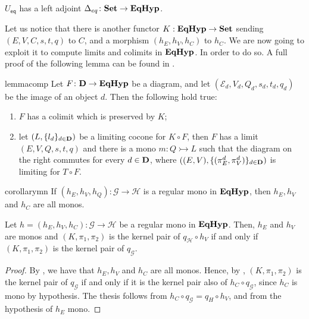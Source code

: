 \documentclass[a4paper,UKenglish,cleveref,pdftex,thm-restate,numberwithinsect]{lipics-v2021}
\newcommand{\eq}{\mathsf{eq}}
\newcommand{\Set}{\mathbf{Set}}
\def\D{\textbf {\textup{D}}}
\newcommand{\catname}[1]{\textbf{\textup{#1}}}
\newcommand{\EqHyp}{\catname{EqHyp}} %
\newcommand{\mto}{\rightarrowtail}
\begin{document}
\begin{corollary}\label{cor:ladj}
	$U_{\eq}$ has a left adjoint $\Delta_{\eq}\colon \Set \to \EqHyp$.
\end{corollary}

Let us notice that there is another functor $K: \EqHyp \to \Set$ sending $(E, V, C, s, t, q)$ to $C$, and a morphism $(h_E, h_V, h_C)$ to $h_C$. We are now going to exploit it to compute limits and colimits in $\EqHyp$. In order to do so. A full proof of the following lemma can be found in .

\noindent
\parbox{11cm}{
\begin{restatable}{lemma}{comp}\label{prop:eqhyp_complete}
Let $F\colon \D \to \EqHyp$ be a diagram, and let $(\mathcal{E}_d, V_d, Q_d, s_d, t_d, q_d)$ be the image of an object $d$. Then the following hold true:
\begin{enumerate}
		\item $F$ has a colimit which is preserved by $K$;
	\item let $(L, \{l_d\}_{d\in \D})$ be a limiting cocone for $K \circ F$, then $F$ has a limit $(E, V, Q, s, t, q)$ and there is a mono $m\colon Q\mto L$ such that the diagram on the right commutes for every $d\in \D$, where $((E, V), \{(\pi^d_E, \pi^d_V)\}_{d\in \D})$ is limiting for $T\circ F$.
\end{enumerate}
\end{restatable}}\hfill 
\parbox{2cm}{}   

\begin{restatable}{corollary}{mn}\label{cor:mono2}
	If $(h_E, h_V, h_Q): \mathcal{G\to H}$ is a regular mono in $\EqHyp$, then $h_E, h_V$ and $h_C$ are all monos.
\end{restatable}


\iffalse 
\begin{proposition}
	Let $h = (h_E, h_V, h_C): \mathcal{G \to H}$ be a regular mono in $\EqHyp$.
	Then, $h_E$ and $h_V$ are monos and $(K, \pi_1, \pi_2)$ is the kernel pair of $q_\mathcal{H}\circ h_V$ if and only if $(K, \pi_1, \pi_2)$ is the kernel pair of $q_\mathcal{G}$.
\end{proposition}

\begin{proof}
	By , we have that $h_E, h_V$ and $h_C$ are all monos.
	Hence, by , $(K, \pi_1, \pi_2)$ is the kernel pair of $q_\mathcal{G}$ if and only if it is the kernel pair also of $h_C \circ q_\mathcal{G}$, since $h_C$ is mono by hypothesis.
	The thesis follows from $h_C \circ q_\mathcal{G} = q_H \circ h_V$, and from the hypothesis of $h_E$ mono.
\end{proof}
\end{document}
